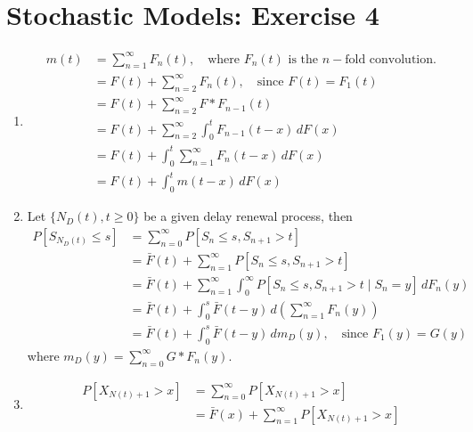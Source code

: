 \documentclass[a4paper,10pt]{article}
\theoremstyle{definition}
\begin{document}
\section*{Stochastic Models: Exercise 4}

\begin{enumerate}
\item 
\begin{align*}
m(t) &= \sum_{n=1}^{\infty}F_n(t),\quad \text{where $F_n(t)$ is the $n-$fold convolution.}\\
&=F(t) + \sum_{n=2}^{\infty}F_n(t) ,\quad\text{since $F(t)=F_1(t)$}\\
&=F(t)+\sum_{n=2}^{\infty} F \ast F_{n-1}(t)\\
&=F(t)+\sum_{n=2}^{\infty} \int_{0}^{t} F_{n-1}(t-x)\,dF(x)\\
&=F(t)+\int_{0}^{t} \sum_{n=1}^{\infty} F_{n}(t-x)\,dF(x)\\
&=F(t)+\int_{0}^{t} m(t-x)\,dF(x)
\end{align*}

\item Let $\{N_D(t), t \geq 0\}$ be a given delay renewal process, then
\begin{align*}
P\left[S_{N_D(t)}\leq s\right] &=\sum_{n=0}^{\infty}P\left[S_{n}\leq s, S_{n+1}>t\right]\\
&=\bar{F}(t)+\sum_{n=1}^{\infty}P\left[S_{n}\leq s, S_{n+1}>t\right]\\
&=\bar{F}(t)+\sum_{n=1}^{\infty}\int_{0}^{\infty}P\left[S_{n}\leq s, S_{n+1}>t\mid S_n=y\right]\,dF_n(y)\\
&=\bar{F}(t)+\int_{0}^{s}\bar{F}(t-y)\,d\left(\sum_{n=1}^{\infty}F_n(y)\right)\\
&=\bar{F}(t)+\int_{0}^{s}\bar{F}(t-y)\,dm_D(y),\quad \text{since $F_1(y)=G(y)$}
\end{align*}
where $m_D(y)=\sum_{n=0}^{\infty}G \ast F_{n}(y)$.
\item
\begin{align*}
P\left[X_{N(t)+1}>x\right]&=\sum_{n=0}^{\infty}P\left[X_{N(t)+1}>x\right]\\
&=\bar{F}(x)+\sum_{n=1}^{\infty}P\left[X_{N(t)+1}>x\right]\\
\end{align*}



\end{enumerate}
\end{document}
